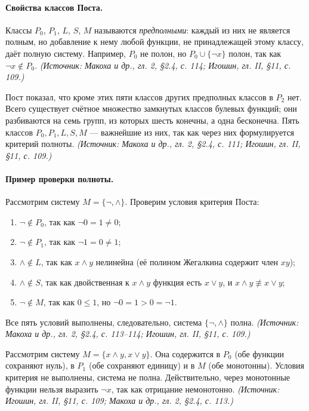 \documentclass[a4paper,12pt]{article}
\begin{document}
\paragraph{Свойства классов Поста.}
Классы \(P_0\), \(P_1\), \(L\), \(S\), \(M\) называются \emph{предполными}: каждый из них не является полным, но добавление к нему любой функции, не принадлежащей этому классу, даёт полную систему. Например, \(P_0\) не полон, но \(P_0\cup\{\neg x\}\) полон, так как \(\neg x\notin P_0\).
\textit{(Источник: Макоха и др., гл. 2, §2.4, с. 114; Игошин, гл. II, §11, с. 109.)}

Пост показал, что кроме этих пяти классов других предполных классов в \(P_2\) нет. Всего существует счётное множество замкнутых классов булевых функций; они разбиваются на семь групп, из которых шесть конечны, а одна бесконечна. Пять классов \(P_0,P_1,L,S,M\) — важнейшие из них, так как через них формулируется критерий полноты.
\textit{(Источник: Макоха и др., гл. 2, §2.4, с. 111; Игошин, гл. II, §11, с. 109.)}

\paragraph{Пример проверки полноты.}
Рассмотрим систему \(M=\{\neg,\land\}\). Проверим условия критерия Поста:
\begin{enumerate}[label=\arabic*)]
\item \(\neg\notin P_0\), так как \(\neg 0=1\ne 0\);
\item \(\neg\notin P_1\), так как \(\neg 1=0\ne 1\);
\item \(\land\notin L\), так как \(x\land y\) нелинейна (её полином Жегалкина содержит член \(xy\));
\item \(\land\notin S\), так как двойственная к \(x\land y\) функция есть \(x\lor y\), и \(x\land y\not\equiv x\lor y\);
\item \(\neg\notin M\), так как \(0\le 1\), но \(\neg 0=1>0=\neg 1\).
\end{enumerate}
Все пять условий выполнены, следовательно, система \(\{\neg,\land\}\) полна.
\textit{(Источник: Макоха и др., гл. 2, §2.4, с. 113--114; Игошин, гл. II, §11, с. 109.)}

Рассмотрим систему \(M=\{x\land y,x\lor y\}\). Она содержится в \(P_0\) (обе функции сохраняют нуль), в \(P_1\) (обе сохраняют единицу) и в \(M\) (обе монотонны). Условия критерия не выполнены, система не полна. Действительно, через монотонные функции нельзя выразить \(\neg x\), так как отрицание немонотонно.
\textit{(Источник: Игошин, гл. II, §11, с. 109; Макоха и др., гл. 2, §2.4, с. 113.)}
\end{document}
